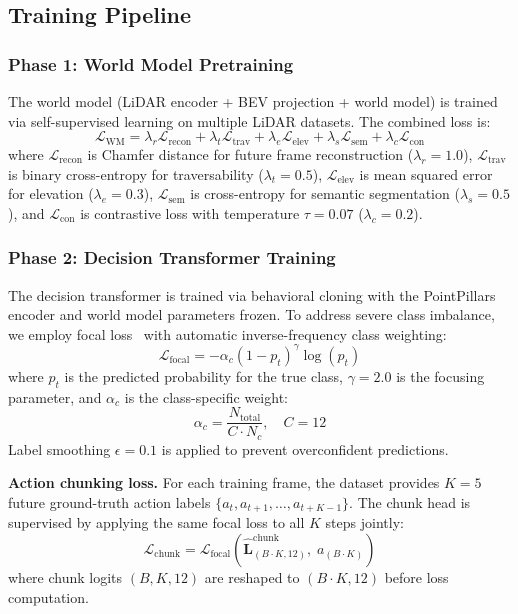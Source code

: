 \documentclass[sensors,article,submit,pdftex,moreauthors]{Definitions/mdpi}
\begin{document}
\subsection{Training Pipeline}
\label{sec:training}

\subsubsection{Phase 1: World Model Pretraining}
The world model (LiDAR encoder + BEV projection + world model) is trained via self-supervised learning on multiple LiDAR datasets. The combined loss is:
\begin{equation}
    \mathcal{L}_\text{WM} = \lambda_r \mathcal{L}_\text{recon} + \lambda_t \mathcal{L}_\text{trav} + \lambda_e \mathcal{L}_\text{elev} + \lambda_s \mathcal{L}_\text{sem} + \lambda_c \mathcal{L}_\text{con}
\end{equation}
where $\mathcal{L}_\text{recon}$ is Chamfer distance for future frame reconstruction ($\lambda_r = 1.0$), $\mathcal{L}_\text{trav}$ is binary cross-entropy for traversability ($\lambda_t = 0.5$), $\mathcal{L}_\text{elev}$ is mean squared error for elevation ($\lambda_e = 0.3$), $\mathcal{L}_\text{sem}$ is cross-entropy for semantic segmentation ($\lambda_s = 0.5$), and $\mathcal{L}_\text{con}$ is contrastive loss with temperature $\tau = 0.07$ ($\lambda_c = 0.2$).

\subsubsection{Phase 2: Decision Transformer Training}
The decision transformer is trained via behavioral cloning with the PointPillars encoder and world model parameters frozen. To address severe class imbalance, we employ focal loss~\cite{lin2017} with automatic inverse-frequency class weighting:
\begin{equation}
    \mathcal{L}_\text{focal} = -\alpha_c (1 - p_t)^\gamma \log(p_t)
\end{equation}
where $p_t$ is the predicted probability for the true class, $\gamma{=}2.0$ is the focusing parameter, and $\alpha_c$ is the class-specific weight:
\begin{equation}
    \alpha_c = \frac{N_\text{total}}{C \cdot N_c}, \quad C = 12
\end{equation}
Label smoothing $\epsilon{=}0.1$ is applied to prevent overconfident predictions.

\textbf{Action chunking loss.}
For each training frame, the dataset provides $K{=}5$ future ground-truth action labels $\{a_t, a_{t+1}, \ldots, a_{t+K-1}\}$. The chunk head is supervised by applying the same focal loss to all $K$ steps jointly:
\begin{equation}
    \mathcal{L}_\text{chunk} = \mathcal{L}_\text{focal}\!\left(\hat{\mathbf{L}}^\text{chunk}_{(B \cdot K, 12)},\; a_{(B \cdot K)}\right)
\end{equation}
where chunk logits $(B, K, 12)$ are reshaped to $(B{\cdot}K, 12)$ before loss computation.
\end{document}
